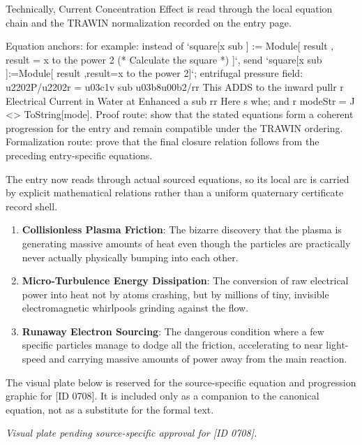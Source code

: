 Technically, Current Concentration Effect is read through the local equation chain and the TRAWIN normalization recorded on the entry page.

Equation anchors: for example: instead of `square[x sub ] := Module[ result , result = x to the power 2 (* Calculate the square *) ]`, send `square[x sub ]:=Module[ result ,result=x to the power 2]`; entrifugal pressure field: u2202P/u2202r = u03c1v sub u03b8u00b2/rr This ADDS to the inward pullr r Electrical Current in Water at Enhanced a sub rr Here s whe; and r modeStr = J <> ToString[mode]. Proof route: show that the stated equations form a coherent progression for the entry and remain compatible under the TRAWIN ordering. Formalization route: prove that the final closure relation follows from the preceding entry-specific equations.

The entry now reads through actual sourced equations, so its local arc is carried by explicit mathematical relations rather than a uniform quaternary certificate record shell.
\endgroup

\begin{enumerate}[leftmargin=1.6em,itemsep=6pt,topsep=4pt]
\item \textbf{Collisionless Plasma Friction}: The bizarre discovery that the plasma is generating massive amounts of heat even though the particles are practically never actually physically bumping into each other.
\item \textbf{Micro-Turbulence Energy Dissipation}: The conversion of raw electrical power into heat not by atoms crashing, but by millions of tiny, invisible electromagnetic whirlpools grinding against the flow.
\item \textbf{Runaway Electron Sourcing}: The dangerous condition where a few specific particles manage to dodge all the friction, accelerating to near light-speed and carrying massive amounts of power away from the main reaction.
\end{enumerate}

\begingroup\footnotesize\sloppy
The visual plate below is reserved for the source-specific equation and progression graphic for [ID 0708]. It is included only as a companion to the canonical equation, not as a substitute for the formal text.
\par\endgroup
\begingroup\footnotesize\itshape
Visual plate pending source-specific approval for [ID 0708].
\par\endgroup


